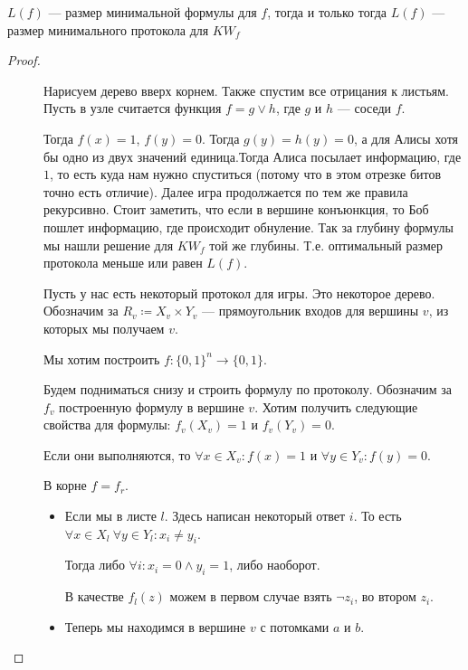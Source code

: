 \begin{thm}
	$ L(f) $ --- размер минимальной формулы для  $ f$, тогда и только тогда $ L(f)$ --- размер минимального протокола для  $ KW_f$
\end{thm}
\begin{proof}
    $ $
    \begin{description}
		\item [] Нарисуем дерево вверх корнем. Также спустим все отрицания к листьям. Пусть в узле считается функция $ f = g \vee h$, где  $ g$ и  $h$ --- соседи  $ f$.

			Тогда $ f(x) = 1$,  $ f(y) = 0$. Тогда $g(y) = h(y) = 0    $, а для Алисы хотя бы одно из двух значений единица.Тогда Алиса посылает информацию, где $ 1$, то есть куда нам нужно спуститься (потому что в этом отрезке битов точно есть отличие). Далее игра продолжается по тем же правила рекурсивно. Стоит заметить, что если в вершине конъюнкция, то Боб пошлет информацию, где происходит обнуление. Так за глубину формулы мы нашли решение для $KW_f$ той же глубины. Т.е. оптимальный размер протокола меньше или равен $L(f)$.
		\item [] 
			Пусть у нас есть некоторый протокол для игры. Это некоторое дерево. Обозначим за $ R_v \coloneqq X_v \times Y_v$ --- прямоугольник входов для вершины $ v$, из которых мы получаем $ v$.

			Мы хотим построить $ f\colon \{0, 1\}^{n} \to \{0, 1\}$.

			Будем подниматься снизу и строить формулу по протоколу. Обозначим за $ f_v$ построенную формулу в вершине  $ v$. Хотим получить следующие свойства для формулы: $ f_v(X_v) = 1$ и  $ f_v(Y_v) = 0$.

			Если они выполняются, то $ \forall x \in X_v \colon f(x) = 1$ и $ \forall y \in Y_v \colon f(y) = 0$.

			В корне $ f = f_r$.

			\begin{itemize}
				\item Если мы в листе $ l$. Здесь написан некоторый ответ $i$. То есть $ \forall x \in X_l ~\forall y \in Y_l \colon x_i \ne  y_i$.

					Тогда либо $ \forall i \colon x_i = 0 \wedge  y_i  = 1$, либо наоборот. %

					В качестве $ f_{l}(z) $ можем в первом случае взять $ \neg z_i$, во втором $z_i$.
				\item Теперь мы находимся в вершине $ v$ с потомками  $ a $ и $ b$.


\end{itemize}
\end{description}
\end{proof}
